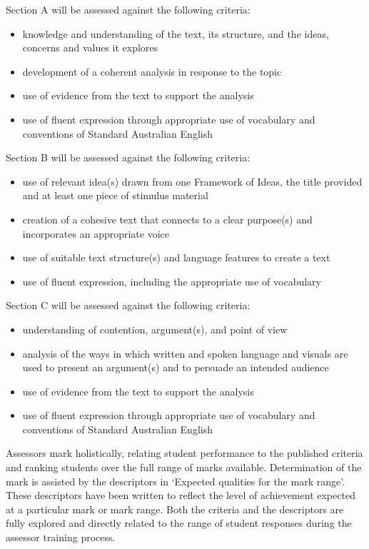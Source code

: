 \documentclass[a4paper]{article}
\begin{document}
Section A will be assessed against the following criteria:
\begin{itemize}
    \item knowledge and understanding of the text, its structure, and the ideas, concerns and values it explores
\item development of a coherent analysis in response to the topic
\item use of evidence from the text to support the analysis
\item use of fluent expression through appropriate use of vocabulary and conventions of Standard Australian English
\end{itemize}
\vspace{1cm}
Section B will be assessed against the following criteria:
\begin{itemize}
    \item use of relevant idea(s) drawn from one Framework of Ideas, the title provided and at least one piece of stimulus material
 \item creation of a cohesive text that connects to a clear purpose(s) and incorporates an appropriate voice
\item use of suitable text structure(s) and language features to create a text
\item use of fluent expression, including the appropriate use of vocabulary 
\end{itemize}
\vspace{1cm}
Section C will be assessed against the following criteria:
\begin{itemize}
    \item understanding of contention, argument(s), and point of view
\item analysis of the ways in which written and spoken language and visuals are used to present an argument(s) and to persuade an intended audience
\item use of evidence from the text to support the analysis
\item use of fluent expression through appropriate use of vocabulary and conventions of Standard Australian English

\end{itemize}
\vspace{1cm}

Assessors mark holistically, relating student performance to the published criteria and ranking students over the full range of marks available. Determination of the mark is assisted by the descriptors in ‘Expected qualities for the mark range’. These descriptors have been written to reflect the level of achievement expected at a particular mark or mark range. Both the criteria and the descriptors are fully explored and directly related to the range of student responses during the assessor training process.\\
\end{document}
